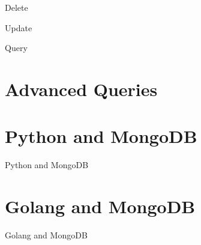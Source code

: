 \documentclass{beamer}
\begin{document}
\begin{frame}{Delete}
    
\end{frame}

\begin{frame}{Update}
    
\end{frame}

\begin{frame}{Query}
    
\end{frame}

\section{Advanced Queries}
\begin{frame}
    
\end{frame}

\section{Python and MongoDB}
\begin{frame}{Python and MongoDB}

\end{frame}

\section{Golang and MongoDB}
\begin{frame}{Golang and MongoDB}

\end{frame}
\end{document}
